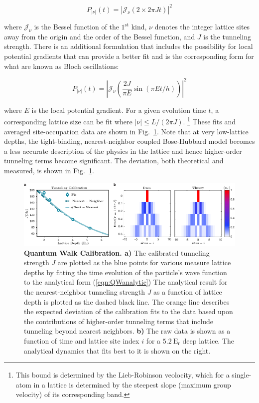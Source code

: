 \begin{equation}
\label{eqn:QWanalytic}
P_{|\nu|}(t)= \left | \mathcal{J}_\nu \left ( {2 \times 2 \pi J t} \right ) \right |^2
\end{equation}

where $\mathcal{J}_\nu$ is the Bessel function of the $1^{\text{st}}$ kind, $\nu$ denotes the integer lattice sites away from the origin and the order of the Bessel function, and $J$ is the tunneling strength. There is an additional formulation that includes the possibility for local potential gradients that can provide a better fit and is the corresponding form for what are known as Bloch oscillations:

\begin{equation}
\label{eqn:BlochOsc}
P_{|\nu|}(t)= \left | \mathcal{J}_\nu \left ( \frac{2 J}{\pi E} \sin \left( {\pi E t / h}\right ) \right ) \right |^2
\end{equation}

where $E$ is the local potential gradient. For a given evolution time $t$, a corresponding lattice size can be fit where $ |\nu| \leq L/(2 \pi J) $. \footnote{This bound is determined by the Lieb-Robinson veolocity, which for a single-atom in a lattice is determined by the steepest slope (maximum group velocity) of its corresponding band.} These fits and averaged site-occupation data are shown in Fig.~\ref{fig:QWCal}. Note that at very low-lattice depths, the tight-binding, nearest-neighbor coupled Bose-Hubbard model becomes a less accurate description of the physics in the lattice and hence higher-order tunneling terms become significant. The deviation, both theoretical and measured, is shown in Fig.~\ref{fig:QWCal}.

\begin{figure}[t!]
		\includegraphics[width=\columnwidth ]{figures/ch2/QW_cal/qw_fit_cal_v2_edit.pdf} 
		\caption{\textbf{Quantum Walk Calibration. a)} The calibrated tunneling strength $J$ are plotted as the blue points for various measure lattice depths by fitting the time evolution of the particle's wave function to the analytical form (\ref{eqn:QWanalytic}) The analytical result for the nearest-neighbor tunneling strength $J$ as a function of lattice depth is plotted as the dashed black line. The orange line describes the expected deviation of the calibration fits to the data based upon the contributions of higher-order tunneling terms that include tunneling beyond nearest neighbors. \textbf{b)} The raw data is shown as a function of time and lattice site index $i$ for a $5.2~\mathrm{E_r}$ deep lattice. The analytical dynamics that fits best to it is shown on the right.}
		\label{fig:QWCal}	
\end{figure}

